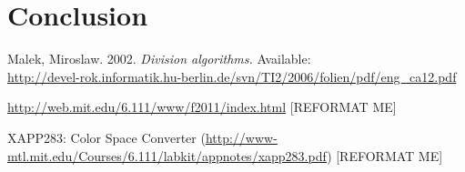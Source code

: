 \documentclass[10pt]{article}
\begin{document}
 
\section{Conclusion}

\begin{thebibliography}{9}

  Malek, Miroslaw.
  2002.
  \emph{Division algorithms.}
  Available: \\ \url{http://devel-rok.informatik.hu-berlin.de/svn/TI2/2006/folien/pdf/eng\_ca12.pdf}

  \url{http://web.mit.edu/6.111/www/f2011/index.html} [REFORMAT ME]

  XAPP283: Color Space Converter (\url{http://www-mtl.mit.edu/Courses/6.111/labkit/appnotes/xapp283.pdf}) [REFORMAT ME]

\end{thebibliography}
\end{document}
